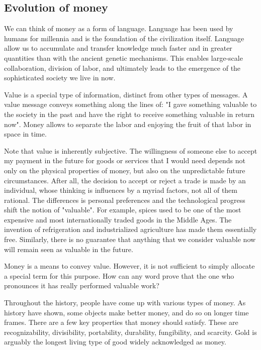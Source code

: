 \subsection{Evolution of money}

We can think of money as a form of language.
Language has been used by humans for millennia and is the foundation of the civilization itself.
Language allow us to accumulate and transfer knowledge much faster and in greater quantities than with the ancient genetic mechanisms.
This enables large-scale collaboration, division of labor, and ultimately leads to the emergence of the sophisticated society we live in now.

Value is a special type of information, distinct from other types of messages.
A value message conveys something along the lines of: "I gave something valuable to the society in the past and have the right to receive something valuable in return now".
Money allows to separate the labor and enjoying the fruit of that labor in space in time.

Note that value is inherently subjective.
The willingness of someone else to accept my payment in the future for goods or services that I would need depends not only on the physical properties of money, but also on the unpredictable future circumstances.
After all, the decision to accept or reject a trade is made by an individual, whose thinking is influences by a myriad factors, not all of them rational.
The differences is personal preferences and the technological progress shift the notion of "valuable".
For example, spices used to be one of the most expensive and most internationally traded goods in the Middle Ages.
The invention of refrigeration and industrialized agriculture has made them essentially free.
Similarly, there is no guarantee that anything that we consider valuable now will remain seen as valuable in the future.

Money is a means to convey value.
However, it is not sufficient to simply allocate a special term for this purpose.
How can any word prove that the one who pronounces it has really performed valuable work?

Throughout the history, people have come up with various types of money.
As history have shown, some objects make better money, and do so on longer time frames.
There are a few key properties that money should satisfy.
These are recognizability, divisibility, portability, durability, fungibility, and scarcity.
Gold is arguably the longest living type of good widely acknowledged as money.

